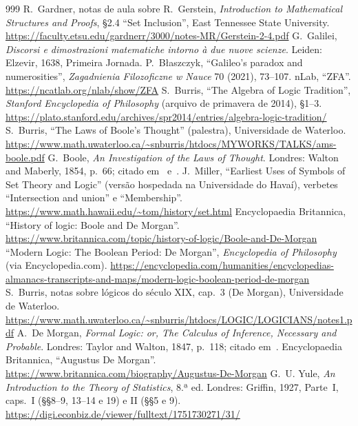 \begin{thebibliography}{999}
 R.~Gardner, notas de aula sobre R.~Gerstein, \emph{Introduction to Mathematical Structures and Proofs}, §2.4 \enquote{Set Inclusion}, East Tennessee State University. \url{https://faculty.etsu.edu/gardnerr/3000/notes-MR/Gerstein-2-4.pdf}
 G.~Galilei, \emph{Discorsi e dimostrazioni matematiche intorno à due nuove scienze}. Leiden: Elzevir, 1638, Primeira Jornada.
 P.~Błaszczyk, \enquote{Galileo's paradox and numerosities}, \emph{Zagadnienia Filozoficzne w Nauce} 70 (2021), 73--107.
 nLab, \enquote{ZFA}. \url{https://ncatlab.org/nlab/show/ZFA}
 S.~Burris, \enquote{The Algebra of Logic Tradition}, \emph{Stanford Encyclopedia of Philosophy} (arquivo de primavera de 2014), §1--3. \url{https://plato.stanford.edu/archives/spr2014/entries/algebra-logic-tradition/}
 S.~Burris, \enquote{The Laws of Boole's Thought} (palestra), Universidade de Waterloo. \url{https://www.math.uwaterloo.ca/~snburris/htdocs/MYWORKS/TALKS/ams-boole.pdf}
 G.~Boole, \emph{An Investigation of the Laws of Thought}. Londres: Walton and Maberly, 1854, p.~66; citado em~\cite{sepAlgLog} e~\cite{burrisTalk}.
 J.~Miller, \enquote{Earliest Uses of Symbols of Set Theory and Logic} (versão hospedada na Universidade do Havaí), verbetes \enquote{Intersection and union} e \enquote{Membership}. \url{https://www.math.hawaii.edu/~tom/history/set.html}
 Encyclopaedia Britannica, \enquote{History of logic: Boole and De Morgan}. \url{https://www.britannica.com/topic/history-of-logic/Boole-and-De-Morgan}
 \enquote{Modern Logic: The Boolean Period: De Morgan}, \emph{Encyclopedia of Philosophy} (via Encyclopedia.com). \url{https://encyclopedia.com/humanities/encyclopedias-almanacs-transcripts-and-maps/modern-logic-boolean-period-de-morgan}
 S.~Burris, notas sobre lógicos do século XIX, cap.~3 (De Morgan), Universidade de Waterloo. \url{https://www.math.uwaterloo.ca/~snburris/htdocs/LOGIC/LOGICIANS/notes1.pdf}
 A.~De Morgan, \emph{Formal Logic: or, The Calculus of Inference, Necessary and Probable}. Londres: Taylor and Walton, 1847, p.~118; citado em~\cite{burrisNotes}.
 Encyclopaedia Britannica, \enquote{Augustus De Morgan}. \url{https://www.britannica.com/biography/Augustus-De-Morgan}
 G.~U. Yule, \emph{An Introduction to the Theory of Statistics}, 8.ª ed. Londres: Griffin, 1927, Parte~I, caps.~I (§§8--9, 13--14 e 19) e II (§§5 e 9). \url{https://digi.econbiz.de/viewer/fulltext/1751730271/31/}

\end{thebibliography}
